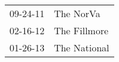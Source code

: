 \begin{supertabular}{p{0.25\columnwidth}p{0.75\columnwidth}}
 09-24-11 &     The NorVa \\
 02-16-12 &  The Fillmore \\
 01-26-13 &  The National \\
\end{supertabular}
